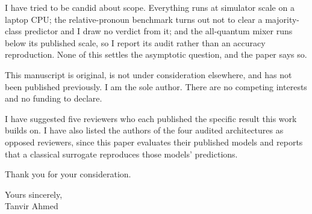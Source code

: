 \documentclass[11pt,a4paper]{article}
\begin{document}
I have tried to be candid about scope. Everything runs at simulator scale on a laptop CPU; the
relative-pronoun benchmark turns out not to clear a majority-class predictor and I draw no verdict
from it; and the all-quantum mixer runs below its published scale, so I report its audit rather
than an accuracy reproduction. None of this settles the asymptotic question, and the paper says so.

This manuscript is original, is not under consideration elsewhere, and has not been published
previously. I am the sole author. There are no competing interests and no funding to declare.

I have suggested five reviewers who each published the specific result this work builds on. I have
also listed the authors of the four audited architectures as opposed reviewers, since this paper
evaluates their published models and reports that a classical surrogate reproduces those models'
predictions.

Thank you for your consideration.

\vspace{1.5em}
\noindent
Yours sincerely,\\[0.8em]
Tanvir Ahmed
\end{document}
